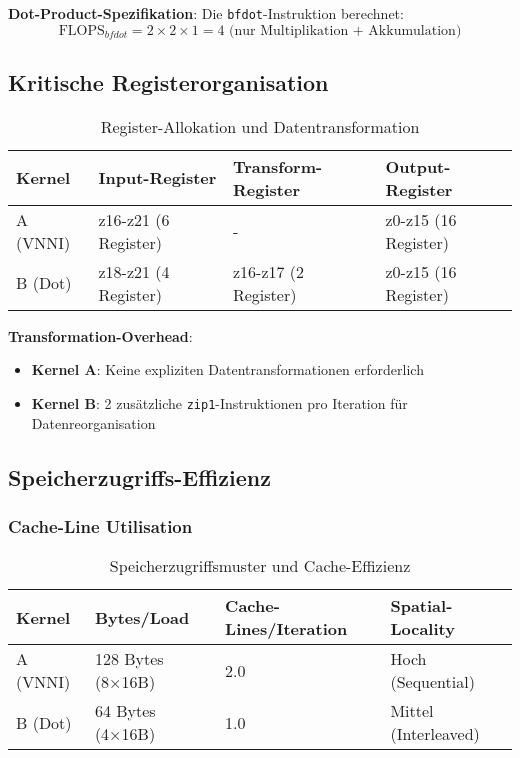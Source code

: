 \documentclass[11pt,a4paper]{article}
\begin{document}
\textbf{Dot-Product-Spezifikation}: Die \texttt{bfdot}-Instruktion berechnet:
\begin{equation}
\text{FLOPS}_{bfdot} = 2 \times 2 \times 1 = 4 \text{ (nur Multiplikation + Akkumulation)}
\end{equation}

\subsection{Kritische Registerorganisation}

\begin{table}[h]
\centering
\caption{Register-Allokation und Datentransformation}
\begin{tabular}{|l|l|l|l|}
\hline
\textbf{Kernel} & \textbf{Input-Register} & \textbf{Transform-Register} & \textbf{Output-Register} \\
\hline
A (VNNI) & z16-z21 (6 Register) & - & z0-z15 (16 Register) \\
B (Dot) & z18-z21 (4 Register) & z16-z17 (2 Register) & z0-z15 (16 Register) \\
\hline
\end{tabular}
\end{table}

\textbf{Transformation-Overhead}:
\begin{itemize}
\item \textbf{Kernel A}: Keine expliziten Datentransformationen erforderlich
\item \textbf{Kernel B}: 2 zusätzliche \texttt{zip1}-Instruktionen pro Iteration für Datenreorganisation
\end{itemize}

\subsection{Speicherzugriffs-Effizienz}

\subsubsection{Cache-Line Utilisation}

\begin{table}[h]
\centering
\caption{Speicherzugriffsmuster und Cache-Effizienz}
\begin{tabular}{|l|l|l|l|}
\hline
\textbf{Kernel} & \textbf{Bytes/Load} & \textbf{Cache-Lines/Iteration} & \textbf{Spatial-Locality} \\
\hline
A (VNNI) & 128 Bytes (8×16B) & 2.0 & Hoch (Sequential) \\
B (Dot) & 64 Bytes (4×16B) & 1.0 & Mittel (Interleaved) \\
\hline
\end{tabular}
\end{table}
\end{document}

